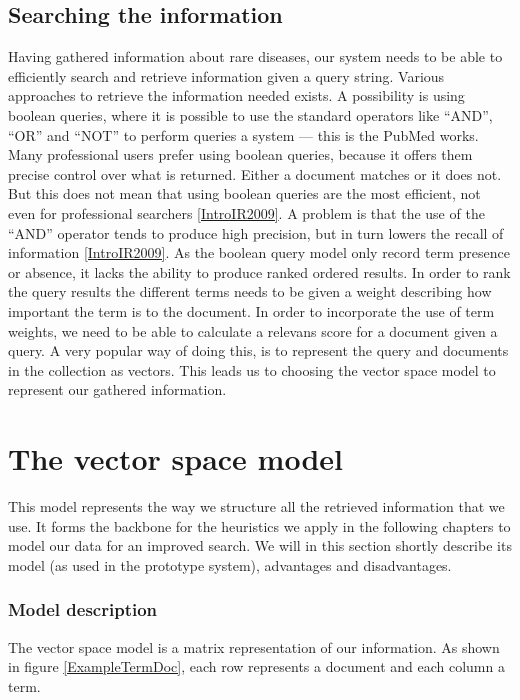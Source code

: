 
\subsection{Searching the information}
Having gathered information about rare diseases, our system needs to
be able to efficiently search and retrieve information given a query
string. Various approaches to retrieve the information needed
exists. A possibility is using boolean queries, where it is possible
to use the standard operators like ``AND'', ``OR'' and ``NOT'' to
perform queries a system --- this is the PubMed works. Many
professional users prefer using boolean queries, because it offers
them precise control over what is returned. Either a document matches
or it does not. But this does not mean that using boolean queries are
the most efficient, not even for professional searchers
\ref{IntroIR2009}. A problem is that the use of the ``AND'' operator
tends to produce high precision, but in turn lowers the recall of
information \ref{IntroIR2009}. As the boolean query model only record
term presence or absence, it lacks the ability to produce ranked
ordered results. In order to rank the query results the different
terms needs to be given a weight describing how important the term is
to the document. In order to incorporate the use of term weights, we
need to be able to calculate a relevans score for a document given a
query. A very popular way of doing this, is to represent the query and
documents in the collection as vectors. This leads us to choosing the
vector space model to represent our gathered information.

\section{The vector space model\label{VectorSpace}}

This model represents the way we structure all the retrieved
information that we use. It forms the backbone for the heuristics we
apply in the following chapters to model our data for an improved
search. We will in this section shortly describe its model (as used in
the prototype system), advantages and disadvantages.

\subsubsection{Model description}
The vector space model is a matrix representation of our
information. As shown in figure \ref{ExampleTermDoc}, each row represents a
document and each column a term.

